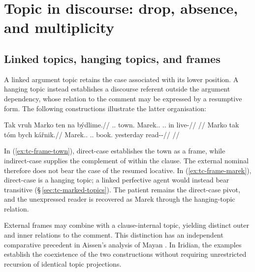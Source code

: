 \section{Topic in discourse: drop, absence, and multiplicity}\label{sec:tc-discourse}
\subsection{Linked topics, hanging topics, and frames}
\label{sec:tc-multiple-topics}

A linked argument topic retains the case associated with its lower position.
 A hanging topic instead establishes a discourse referent outside the argument
 dependency, whose relation to the comment may be expressed by a resumptive
 form. The following constructions illustrate the latter organisation:

\pex\label{ex:tc-frame-top}
\a\label{ex:tc-frame-town}%
\begingl
\gla Tak vruh Marko ten na býdlime.//
\glb \Dem{}.\Prox{}.\Dir{} town.\Dir{} Marek.\Dir{}.\Def{} \Dem{}.\Prox{}.\Ind{} in live-\Prog{}//
\glft {}
      //
\endgl
\a\label{ex:tc-frame-marek}%
\begingl
\gla Marko tak tóm bych kářnik.//
\glb Marek.\Dir{}.\Def{} \Dem{}.\Prox{}.\Dir{} book.\Dir{} yesterday read-\Trs{}-\Pf{}//
\glft {}
      //
\endgl
\xe

\noindent In (\ref{ex:tc-frame-town}), direct-case  establishes
 the town as a frame, while indirect-case  supplies the complement of
  within the clause. The external nominal therefore does not bear the
 case of the resumed locative. In (\ref{ex:tc-frame-marek}), direct-case
  is a hanging topic; a linked perfective agent would instead bear
 transitive  (§\,\ref{sec:tc-marked-topics}). The patient
  remains the direct-case pivot, and the unexpressed reader is
 recovered as Marek through the hanging-topic relation.

External frames may combine with a clause-internal topic, yielding distinct
 outer and inner relations to the comment. This distinction has an independent
 comparative precedent in Aissen's analysis of Mayan \cite{aissen1992}.
 In Iridian, the examples establish the coexistence of the two constructions
 without requiring unrestricted recursion of identical topic projections.

